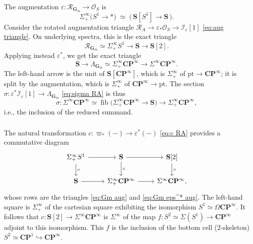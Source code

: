 \documentclass[12pt, oneside]{amsart}
\numberwithin{equation}{section}
\theoremstyle{remark}
\theoremstyle{plain}
\newcommand{\R}{\mathcal{R}}
\newcommand{\RA}{\R_A}
\newcommand{\lam}{\Lambda}
\newcommand{\OO}{\mathcal{O}}
\newcommand{\GGm}{\mathbf{G}_{m}}
\newcommand{\eps}{\varepsilon}
\begin{document}
The augmentation $\eps : \R_{\GGm} \to \OO_S$ is
\[
  \Sigma^\infty_+\bigl( S^1 \to * \bigr) \;\simeq\; \bigl( \,\mathbf{S}[S^1] \to \mathbf{S} \,\bigr).
\]
Consider the rotated augmentation triangle $\RA \to \eps_*\OO_S \to \mathcal{I}_{\eps}[1]$ \eqref{eq:aug triangle}.
On underlying spectra, this is the exact triangle
\begin{equation}\label{eq:Gm aug}
  \R_{\GGm} \simeq \Sigma^\infty_+ S^1
  \to \mathbf{S}
  \to \mathbf{S}[2].
\end{equation}
Applying instead $\eps^*$, we get the exact triangle
\begin{equation}\label{eq:Gm eps^* aug}
  \mathbf{S}
  \to \lam_{\GGm} \simeq \Sigma^\infty_+ \mathbf{C}\mathbf{P}^\infty
  \to \Sigma^\infty \mathbf{C}\mathbf{P}^\infty.
\end{equation}
The left-hand arrow is the unit of $\mathbf{S}[\mathbf{C}\mathbf{P}^\infty]$, which is $\Sigma^\infty_+$ of $\mathrm{pt} \to \mathbf{C}\mathbf{P}^\infty$; it is split by the augmentation, which is $\Sigma^\infty_+$ of $\mathbf{C}\mathbf{P}^\infty \to \mathrm{pt}$.
The section $\sigma : \eps^* \mathcal{I}_{\eps}[1] \to \lam_{\GGm}$ \eqref{eq:sigma RA} is thus
\begin{equation*}
  \sigma : \Sigma^\infty \mathbf{C}\mathbf{P}^\infty
  \simeq \operatorname{fib}\bigl(\Sigma^\infty_+ \mathbf{C}\mathbf{P}^\infty \to \mathbf{S}\bigr)
  \longrightarrow \Sigma^\infty_+ \mathbf{C}\mathbf{P}^\infty,
\end{equation*}
i.e., the inclusion of the reduced summand.

\subsubsection{}

The natural transformation $c : \varpi_*(-) \to \eps^*(-)$ \eqref{eq:c RA} provides a commutative diagram
\[\begin{tikzcd}
  \Sigma^\infty_+ S^1 \ar{r}\ar{d}{c}
  & \mathbf{S} \ar{r}\ar{d}{c}
  & \mathbf{S}[2] \ar{d}{c}\\
  \mathbf{S} \ar{r}
  & \Sigma^\infty_+ \mathbf{C}\mathbf{P}^\infty \ar{r}
  & \Sigma^\infty \mathbf{C}\mathbf{P}^\infty,
\end{tikzcd}\]
whose rows are the triangles \eqref{eq:Gm aug} and \eqref{eq:Gm eps^* aug}.
The left-hand square is $\Sigma^\infty_+$ of the cartesian square exhibiting the isomorphism $S^1 \simeq \Omega \mathbf{C}\mathbf{P}^\infty$.
It follows that $c : \mathbf{S}[2] \to \Sigma^\infty \mathbf{C}\mathbf{P}^\infty$ is $\Sigma^\infty$ of the map $f : S^2 \simeq \Sigma(S^1) \to \mathbf{C}\mathbf{P}^\infty$ adjoint to this isomorphism.
This $f$ is the inclusion of the bottom cell (2-skeleton) $S^2 \simeq \mathbf{C}\mathbf{P}^1 \hookrightarrow \mathbf{C}\mathbf{P}^\infty$.
\end{document}
